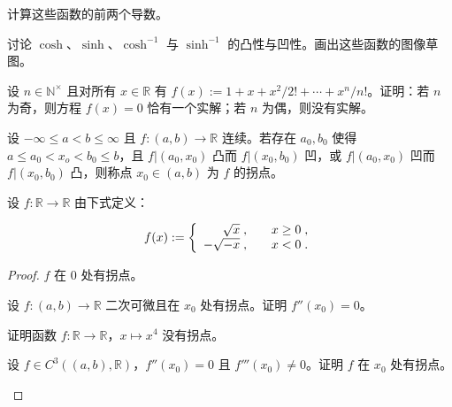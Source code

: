 \begin{exercises}
\begin{items}
计算这些函数的前两个导数。

\item

讨论 $\cosh$、$\sinh$、$ \cosh^{-1} $ 与 $ \sinh^{-1} $ 的凸性与凹性。画出这些函数的图像草图。

\end{items}

\item[6.]

设 $ n \in \mathbb{N}^\times $ 且对所有 $ x \in \mathbb{R} $ 有 $ f(x) := 1 + x + x^2/2! + \cdots + x^n/n! $。证明：若 $ n $ 为奇，则方程 $ f(x) = 0 $ 恰有一个实解；若 $ n $ 为偶，则没有实解。

\item[7.]

设 $ -\infty \leq a < b \leq \infty $ 且 $ f: (a, b) \to \mathbb{R} $ 连续。若存在 $ a_0, b_0 $ 使得 $ a \leq a_0 < x_o < b_0 \leq b $，且 $ f|(a_0, x_0) $ 凸而 $ f|(x_0, b_0) $ 凹，或 $ f|(a_0, x_0) $ 凹而 $ f|(x_0, b_0) $ 凸，则称点 $ x_0 \in (a, b) $ 为 $ f $ 的拐点。

\begin{items}
\item

设 $ f: \mathbb{R} \to \mathbb{R} $ 由下式定义：

\begin{equation*}
f(x):=\left\{\begin{array}{r l}{\sqrt{x}\;,}&{\quad x\geq0\;,}\\ {-\sqrt{-x}\;,}&{\quad x<0\;.}\end{array}\right.
\end{equation*}
\end{items}

\end{exercises}

\begin{proof}

$f$ 在 $0$ 处有拐点。

\begin{items}
\item[（b）]

设 $ f: (a,b) \to \mathbb{R} $ 二次可微且在 $ x_0 $ 处有拐点。证明 $ f''(x_0) = 0 $。

\item[（c）]

证明函数 $ f: \mathbb{R} \to \mathbb{R} $，$ x \mapsto x^4 $ 没有拐点。

\item[（d）]

设 $ f \in C^3((a,b), \mathbb{R}) $，$ f''(x_0) = 0 $ 且 $ f'''(x_0) \neq 0 $。证明 $ f $ 在 $ x_0 $ 处有拐点。

\end{items}

\end{proof}

